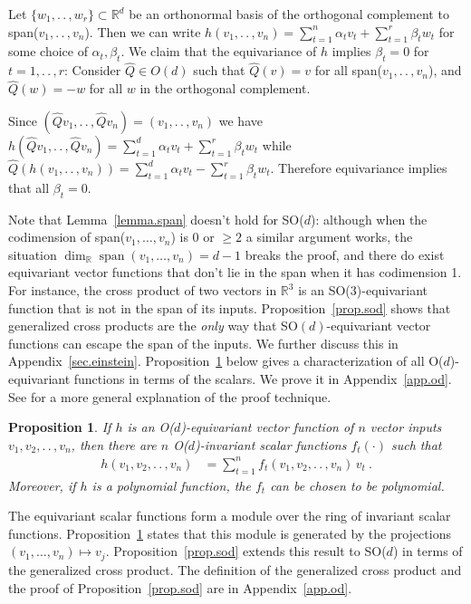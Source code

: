 \documentclass{article}
\makeatletter
\theoremstyle{Hogg}
\newtheorem{proposition}[theorem]{Proposition}
\renewenvironment{proof}[1][\proofname]{\par
  \vspace{-\topsep}%
  \pushQED{\qed}%
  \normalfont
  \topsep0pt \partopsep0pt %
  \trivlist
  \item[\hskip\labelsep
        \itshape
    #1\@addpunct{.}]\ignorespaces
}{%
  \popQED\endtrivlist\@endpefalse
  \addvspace{0pt plus 0pt} %
}
\renewcommand{\ldots}{.\,.\,}
\renewcommand{\cdots}{\ldots}
\makeatother
\begin{document}
\begin{proof}
Let $\{w_1, \ldots, w_r\}\subset \mathbb R^d$ be an orthonormal basis of the orthogonal complement to span($v_1,\ldots, v_n$). Then we can write $h(v_1,\ldots, v_n)=\sum_{t=1}^n \alpha_t v_t + \sum_{t=1}^r \beta_t w_t  $ for some choice of $\alpha_t, \beta_t $. We claim that the equivariance of $h$ implies $\beta_t=0$ for $t=1,\ldots, r$: Consider $\hat Q\in O(d)$ such that $\hat Q(v)=v$ for all span($v_1,\ldots, v_n$), and
$\hat Q(w)=-w$ for all $w$ in the orthogonal complement.

Since $(\hat Qv_1,\ldots, \hat Qv_n) =(v_1,\ldots, v_n)$ we have $h(\hat Q v_1, \ldots, \hat Q v_n)= \sum_{t=1}^d \alpha_t v_t +\sum_{t=1}^r \beta_t w_t $ while $\hat Q(h(v_1, \ldots, v_n))=  \sum_{t=1}^d \alpha_t v_t - \sum_{t=1}^r \beta_t w_t $. Therefore equivariance implies that all $\beta_t=0$.
\end{proof}

Note that Lemma~\ref{lemma.span} doesn't hold for SO($d$): although when the codimension of span($v_1,\dots,v_n$) is 0 or $\geq 2$ a similar argument works, the situation $\operatorname{dim}_{\mathbb R} \operatorname{span}(v_1,\dots,v_n) = d-1$ breaks the proof, and there do exist equivariant vector functions that don't lie in the span when it has codimension 1. For instance, the cross product of two vectors in $\mathbb R^3$ is an SO($3$)-equivariant function that is not in the span of its inputs. Proposition~\ref{prop.sod} shows that generalized cross products are the {\em only} way that SO$(d)$-equivariant vector functions can escape the span of the inputs. 
We further discuss this in Appendix~\ref{sec.einstein}.
Proposition~\ref{prop.invariance} below gives a characterization of all O($d$)-equivariant functions in terms of the scalars. We prove it in Appendix~\ref{app.od}. 
See \cite{blum-smith} for a more general explanation of the proof technique.
\begin{proposition} \label{prop.invariance}
If $h$ is an O($d$)-equivariant vector function of $n$ vector inputs $v_1, v_2, \cdots, v_n$, then there are $n$ O($d$)-invariant scalar functions $f_t(\cdot)$ such that
\begin{align} \label{eq.o.equivariant}
    h(v_1, v_2, \cdots, v_n) &= \textstyle\sum_{t=1}^n f_t(v_1, v_2, \cdots, v_n)\,v_t
    ~. 
\end{align}
Moreover, if $h$ is a polynomial function, the $f_t$ can be chosen to be polynomial.
\end{proposition}
The equivariant scalar functions form a module over the ring of invariant scalar functions. Proposition~\ref{prop.invariance} states that this module is generated by the projections $(v_1,\dots,v_n)\mapsto v_j$. 
Proposition~\ref{prop.sod} extends this result to SO($d$) in terms of the generalized cross product. The definition of the generalized cross product and the proof of Proposition~\ref{prop.sod} are in Appendix~\ref{app.od}.
\end{document}
